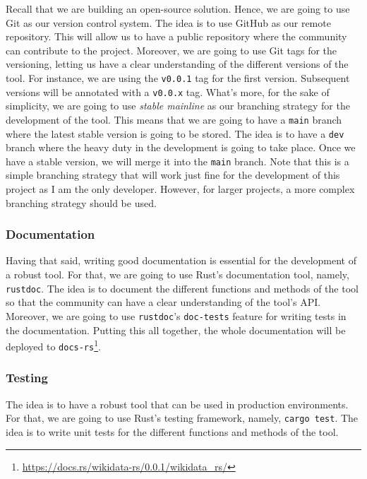 Recall that we are building an open-source solution. Hence, we are going to use Git as our version control system. The idea is to use GitHub as our remote repository. This will allow us to have a public repository where the community can contribute to the project. Moreover, we are going to use Git tags for the versioning, letting us have a clear understanding of the different versions of the tool. For instance, we are using the \texttt{v0.0.1} tag for the first version. Subsequent versions will be annotated with a \texttt{v0.0.x} tag. What's more, for the sake of simplicity, we are going to use \textit{stable mainline} as our branching strategy for the development of the tool. This means that we are going to have a \texttt{main} branch where the latest stable version is going to be stored. The idea is to have a \texttt{dev} branch where the heavy duty in the development is going to take place. Once we have a stable version, we will merge it into the \texttt{main} branch. Note that this is a simple branching strategy that will work just fine for the development of this project as I am the only developer. However, for larger projects, a more complex branching strategy should be used.

\subsubsection{Documentation}

Having that said, writing good documentation is essential for the development of a robust tool. For that, we are going to use Rust's documentation tool, namely, \texttt{rustdoc}. The idea is to document the different functions and methods of the tool so that the community can have a clear understanding of the tool's API. Moreover, we are going to use \texttt{rustdoc}'s \texttt{doc-tests} feature for writing tests in the documentation. Putting this all together, the whole documentation will be deployed to \texttt{docs-rs}\footnote{\url{https://docs.rs/wikidata-rs/0.0.1/wikidata_rs/}}.

\subsubsection{Testing}

The idea is to have a robust tool that can be used in production environments. For that, we are going to use Rust's testing framework, namely, \texttt{cargo test}. The idea is to write unit tests for the different functions and methods of the tool.

